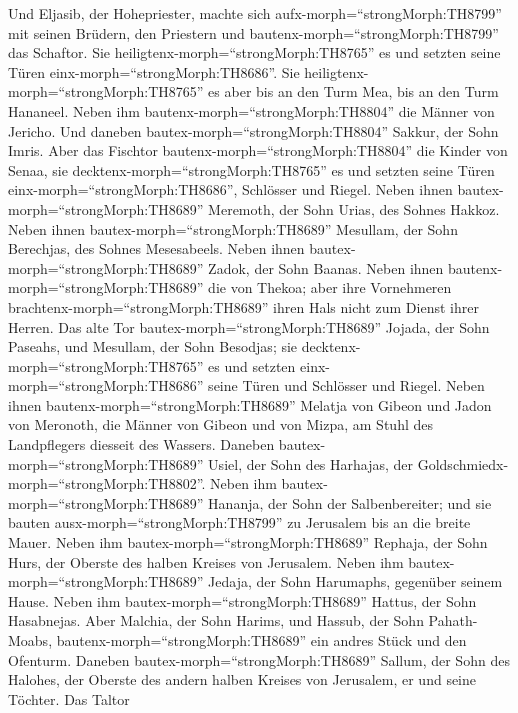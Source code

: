  Und Eljasib, der Hohepriester, machte sich
aufx-morph=``strongMorph:TH8799'' mit seinen Brüdern, den Priestern und
bautenx-morph=``strongMorph:TH8799'' das Schaftor. Sie
heiligtenx-morph=``strongMorph:TH8765'' es und setzten seine Türen
einx-morph=``strongMorph:TH8686''. Sie
heiligtenx-morph=``strongMorph:TH8765'' es aber bis an den Turm Mea, bis
an den Turm Hananeel.  Neben ihm
bautenx-morph=``strongMorph:TH8804'' die Männer von Jericho. Und daneben
bautex-morph=``strongMorph:TH8804'' Sakkur, der Sohn Imris. 
Aber das Fischtor bautenx-morph=``strongMorph:TH8804'' die Kinder von
Senaa, sie decktenx-morph=``strongMorph:TH8765'' es und setzten seine
Türen einx-morph=``strongMorph:TH8686'', Schlösser und Riegel.
 Neben ihnen bautex-morph=``strongMorph:TH8689'' Meremoth,
der Sohn Urias, des Sohnes Hakkoz. Neben ihnen
bautex-morph=``strongMorph:TH8689'' Mesullam, der Sohn Berechjas, des
Sohnes Mesesabeels. Neben ihnen bautex-morph=``strongMorph:TH8689''
Zadok, der Sohn Baanas.  Neben ihnen
bautenx-morph=``strongMorph:TH8689'' die von Thekoa; aber ihre
Vornehmeren brachtenx-morph=``strongMorph:TH8689'' ihren Hals nicht zum
Dienst ihrer Herren.  Das alte Tor
bautex-morph=``strongMorph:TH8689'' Jojada, der Sohn Paseahs, und
Mesullam, der Sohn Besodjas; sie decktenx-morph=``strongMorph:TH8765''
es und setzten einx-morph=``strongMorph:TH8686'' seine Türen und
Schlösser und Riegel.  Neben ihnen
bautenx-morph=``strongMorph:TH8689'' Melatja von Gibeon und Jadon von
Meronoth, die Männer von Gibeon und von Mizpa, am Stuhl des Landpflegers
diesseit des Wassers.  Daneben
bautex-morph=``strongMorph:TH8689'' Usiel, der Sohn des Harhajas, der
Goldschmiedx-morph=``strongMorph:TH8802''. Neben ihm
bautex-morph=``strongMorph:TH8689'' Hananja, der Sohn der
Salbenbereiter; und sie bauten ausx-morph=``strongMorph:TH8799'' zu
Jerusalem bis an die breite Mauer.  Neben ihm
bautex-morph=``strongMorph:TH8689'' Rephaja, der Sohn Hurs, der Oberste
des halben Kreises von Jerusalem.  Neben ihm
bautex-morph=``strongMorph:TH8689'' Jedaja, der Sohn Harumaphs,
gegenüber seinem Hause. Neben ihm bautex-morph=``strongMorph:TH8689''
Hattus, der Sohn Hasabnejas.  Aber Malchia, der Sohn
Harims, und Hassub, der Sohn Pahath-Moabs,
bautenx-morph=``strongMorph:TH8689'' ein andres Stück und den Ofenturm.
 Daneben bautex-morph=``strongMorph:TH8689'' Sallum, der
Sohn des Halohes, der Oberste des andern halben Kreises von Jerusalem,
er und seine Töchter.  Das Taltor
